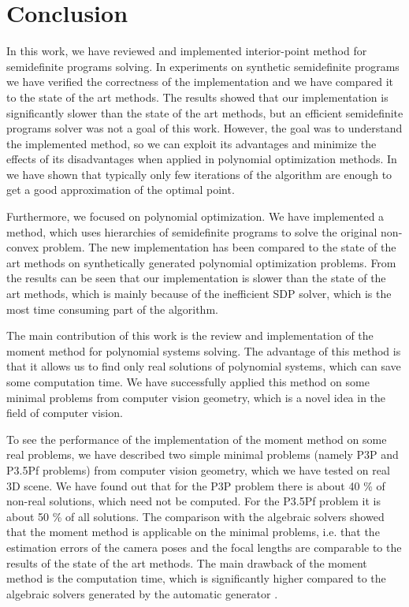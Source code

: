 \chapter{Conclusion}
In this work, we have reviewed and implemented interior-point method for semidefinite programs solving.
In experiments on synthetic semidefinite programs we have verified the correctness of the implementation and we have compared it to the state of the art methods.
The results showed that our implementation is significantly slower than the state of the art methods, but an efficient semidefinite programs solver was not a goal of this work.
However, the goal was to understand the implemented method, so we can exploit its advantages and minimize the effects of its disadvantages when applied in polynomial optimization methods.
In  we have shown that typically only few iterations of the algorithm are enough to get a good approximation of the optimal point.

Furthermore, we focused on polynomial optimization.
We have implemented a method, which uses hierarchies of semidefinite programs to solve the original non-convex problem.
The new implementation has been compared to the state of the art methods on synthetically generated polynomial optimization problems.
From the results can be seen that our implementation is slower than the state of the art methods, which is mainly because of the inefficient SDP solver, which is the most time consuming part of the algorithm.

The main contribution of this work is the review and implementation of the moment method for polynomial systems solving.
The advantage of this method is that it allows us to find only real solutions of polynomial systems, which can save some computation time.
We have successfully applied this method on some minimal problems from computer vision geometry, which is a novel idea in the field of computer vision.

To see the performance of the implementation of the moment method on some real problems, we have described two simple minimal problems (namely P3P and P3.5Pf problems) from computer vision geometry, which we have tested on real 3D scene.
We have found out that for the P3P problem there is about 40 \% of non-real solutions, which need not be computed.
For the P3.5Pf problem it is about 50 \% of all solutions.
The comparison with the algebraic solvers showed that the moment method is applicable on the minimal problems, i.e. that the estimation errors of the camera poses and the focal lengths are comparable to the results of the state of the art methods.
The main drawback of the moment method is the computation time, which is significantly higher compared to the algebraic solvers generated by the automatic generator \cite{autogen}.

